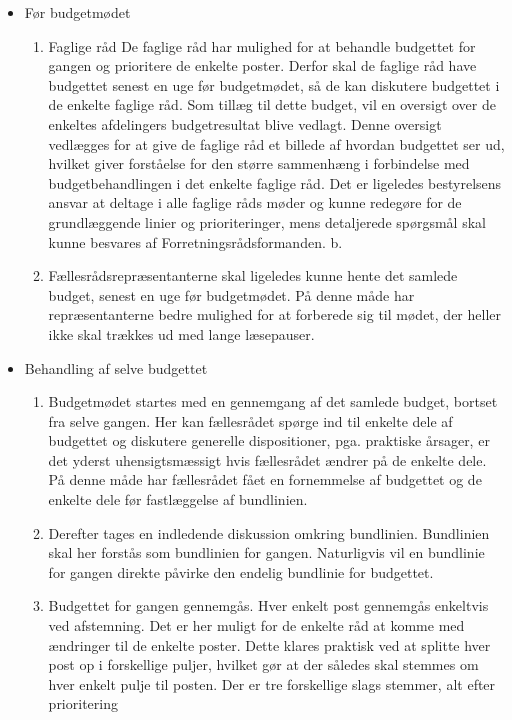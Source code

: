 \begin{itemize}
\item Før budgetmødet
\begin{enumerate}
\item 
Faglige råd
De faglige råd har mulighed for at behandle budgettet for gangen og prioritere de enkelte poster.
Derfor skal de faglige råd have budgettet senest en uge før budgetmødet, så de kan diskutere budgettet
i de enkelte faglige råd. Som tillæg til dette budget, vil en oversigt over de enkeltes afdelingers
budgetresultat blive vedlagt. Denne oversigt vedlægges for at give de faglige råd et billede af hvordan
budgettet ser ud, hvilket giver forståelse for den større sammenhæng i forbindelse med
budgetbehandlingen i det enkelte faglige råd.
Det er ligeledes bestyrelsens ansvar at deltage i alle faglige råds møder og kunne redegøre for de
grundlæggende linier og prioriteringer, mens detaljerede spørgsmål skal kunne besvares af
Forretningsrådsformanden.
b.
\item Fællesrådsrepræsentanterne skal ligeledes kunne hente det samlede budget, senest en uge før
budgetmødet. På denne måde har repræsentanterne bedre mulighed for at forberede sig til mødet, der
heller ikke skal trækkes ud med lange læsepauser.
\end{enumerate} 
\item Behandling af selve budgettet
\begin{enumerate}
\item Budgetmødet startes med en gennemgang af det samlede budget, bortset fra selve gangen. Her kan
fællesrådet spørge ind til enkelte dele af budgettet og diskutere generelle dispositioner, pga. praktiske
årsager, er det yderst uhensigtsmæssigt hvis fællesrådet ændrer på de enkelte dele.
På denne måde har fællesrådet fået en fornemmelse af budgettet og de enkelte dele før fastlæggelse af
bundlinien.
\item Derefter tages en indledende diskussion omkring bundlinien. Bundlinien skal her forstås som
bundlinien for gangen. Naturligvis vil en bundlinie for gangen direkte påvirke den endelig bundlinie
for budgettet.
\item Budgettet for gangen gennemgås. Hver enkelt post gennemgås enkeltvis ved afstemning. Det er her
muligt for de enkelte råd at komme med ændringer til de enkelte poster. Dette klares praktisk ved at
splitte hver post op i forskellige puljer, hvilket gør at der således skal stemmes om hver enkelt pulje til
posten. Der er tre forskellige slags stemmer, alt efter prioritering


\end{enumerate}
\end{itemize}
